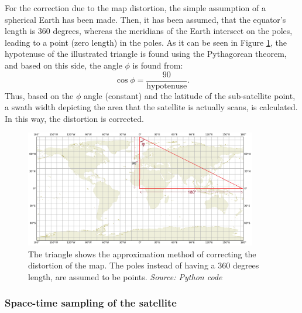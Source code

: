 For the correction due to the map distortion, the simple assumption of a spherical Earth has been made. Then, it has been assumed, that the equator's length is 360 degrees, whereas the meridians of the Earth intersect on the poles, leading to a point (zero length) in the poles. As it can be seen in Figure \ref{correction_map_distortion}, the hypotenuse of the illustrated triangle is found using the Pythagorean theorem, and based on this side, the angle $\phi$ is found from: $$ \cos{\phi} = \frac{90}{\text{hypotenuse}}.$$
Thus, based on the $\phi$ angle (constant) and the latitude of the sub-satellite point, a swath width depicting the area that the satellite is actually scans, is calculated. In this way, the distortion is corrected.

\begin{figure}
\centering
\includegraphics[width=0.9\textwidth]{Images/correction_map_distortion.png}\caption{The triangle shows the approximation method of correcting the distortion of the map. The poles instead of having a 360 degrees length, are assumed to be points. \textit{Source: Python code}}
\label{correction_map_distortion}
\end{figure}

\bigskip
\subsubsection{Space-time sampling of the satellite}
\bigskip

